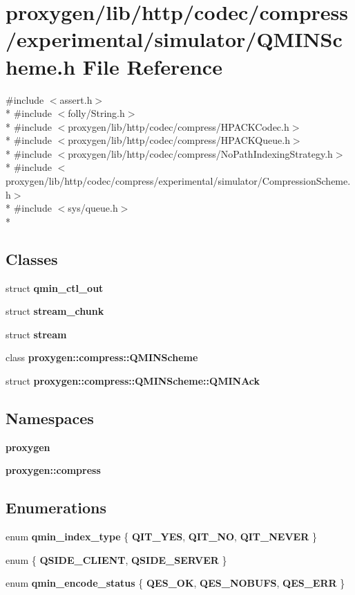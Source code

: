 \section{proxygen/lib/http/codec/compress/experimental/simulator/\+Q\+M\+I\+N\+Scheme.h File Reference}
\label{QMINScheme_8h}
{\ttfamily \#include $<$assert.\+h$>$}\\*
{\ttfamily \#include $<$folly/\+String.\+h$>$}\\*
{\ttfamily \#include $<$proxygen/lib/http/codec/compress/\+H\+P\+A\+C\+K\+Codec.\+h$>$}\\*
{\ttfamily \#include $<$proxygen/lib/http/codec/compress/\+H\+P\+A\+C\+K\+Queue.\+h$>$}\\*
{\ttfamily \#include $<$proxygen/lib/http/codec/compress/\+No\+Path\+Indexing\+Strategy.\+h$>$}\\*
{\ttfamily \#include $<$proxygen/lib/http/codec/compress/experimental/simulator/\+Compression\+Scheme.\+h$>$}\\*
{\ttfamily \#include $<$sys/queue.\+h$>$}\\*
\subsection*{Classes}
\begin{DoxyCompactItemize}
\item 
struct {\bf qmin\+\_\+ctl\+\_\+out}
\item 
struct {\bf stream\+\_\+chunk}
\item 
struct {\bf stream}
\item 
class {\bf proxygen\+::compress\+::\+Q\+M\+I\+N\+Scheme}
\item 
struct {\bf proxygen\+::compress\+::\+Q\+M\+I\+N\+Scheme\+::\+Q\+M\+I\+N\+Ack}
\end{DoxyCompactItemize}
\subsection*{Namespaces}
\begin{DoxyCompactItemize}
\item 
 {\bf proxygen}
\item 
 {\bf proxygen\+::compress}
\end{DoxyCompactItemize}
\subsection*{Enumerations}
\begin{DoxyCompactItemize}
\item 
enum {\bf qmin\+\_\+index\+\_\+type} \{ {\bf Q\+I\+T\+\_\+\+Y\+ES}, 
{\bf Q\+I\+T\+\_\+\+NO}, 
{\bf Q\+I\+T\+\_\+\+N\+E\+V\+ER}
 \}
\item 
enum \{ {\bf Q\+S\+I\+D\+E\+\_\+\+C\+L\+I\+E\+NT}, 
{\bf Q\+S\+I\+D\+E\+\_\+\+S\+E\+R\+V\+ER}
 \}
\item 
enum {\bf qmin\+\_\+encode\+\_\+status} \{ {\bf Q\+E\+S\+\_\+\+OK}, 
{\bf Q\+E\+S\+\_\+\+N\+O\+B\+U\+FS}, 
{\bf Q\+E\+S\+\_\+\+E\+RR}
 \}
\end{DoxyCompactItemize}

